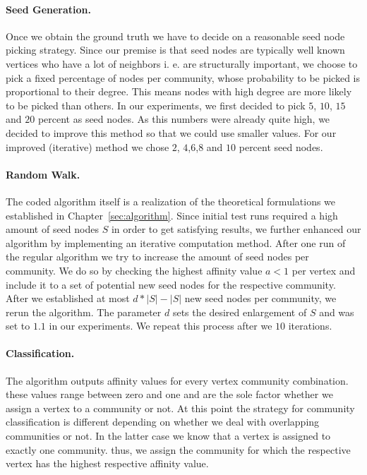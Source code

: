 \paragraph{Seed Generation.}
Once we obtain the ground truth we have to decide on a reasonable seed node 
picking strategy. Since our premise is that seed nodes are typically well known vertices who have a lot of neighbors i. e. are structurally important, we choose to pick a fixed percentage of nodes per community, whose probability to be picked is proportional to their degree. This means nodes with high degree are more likely to be picked than others. In our experiments, we first decided to pick $5$, $10$, $15$ and $20$ percent as seed nodes. As this numbers were already quite high, we decided to improve this method so that we could use smaller values. For our improved (iterative) method we chose $2$, $4$,$6$,$8$ and $10$ percent seed nodes.

\paragraph{Random Walk.}
The coded algorithm itself is a realization of the theoretical formulations we 
established in Chapter~\ref{sec:algorithm}. Since initial test runs required a high amount of seed nodes $S$ in order to get satisfying results, we further enhanced our algorithm by implementing an iterative computation method. After one run of the regular algorithm we try to increase the amount of seed nodes per community. We do so by checking the highest affinity value $a < 1$ per vertex and include it to a set of potential new seed nodes for the respective community. After we established at most $d * \left| S \right| - \left| S \right|$ new seed nodes per community, we rerun the algorithm. The parameter $d$ sets the desired enlargement of $S$ and was set to $1.1$ in our experiments. We repeat this process after we $10$ iterations.

\paragraph{Classification.}
The algorithm outputs affinity values for every vertex community combination. 
these values range between zero and one and are the sole factor whether we 
assign a vertex to a community or not. At this point the strategy for community classification is different depending on whether we deal with overlapping communities or not. In the latter case we know that a vertex is assigned to exactly one community. thus, we assign the community for which the respective vertex has the highest respective affinity value. 

